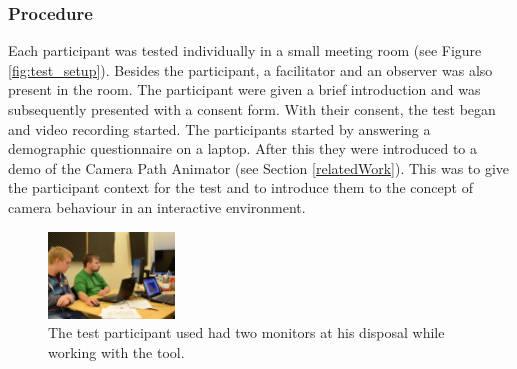 \subsubsection{Procedure}
Each participant was tested individually in a small meeting room (see Figure \ref{fig:test_setup}). Besides the participant, a facilitator and an observer was also present in the room. The participant were given a brief introduction and was subsequently presented with a consent form. With their consent, the test began and video recording started. The participants started by answering a demographic questionnaire on a laptop. After this they were introduced to a demo of the Camera Path Animator (see Section \ref{relatedWork}). This was to give the participant context for the test and to introduce them to the concept of camera behaviour in an interactive environment. 

\begin{figure}[htbp]
\centering
\includegraphics[width=0.3\textwidth]{Pics/test_setup}
\caption{The test participant used had two monitors at his disposal while working with the tool.}
\label{fig:framingConcept}
\end{figure}

